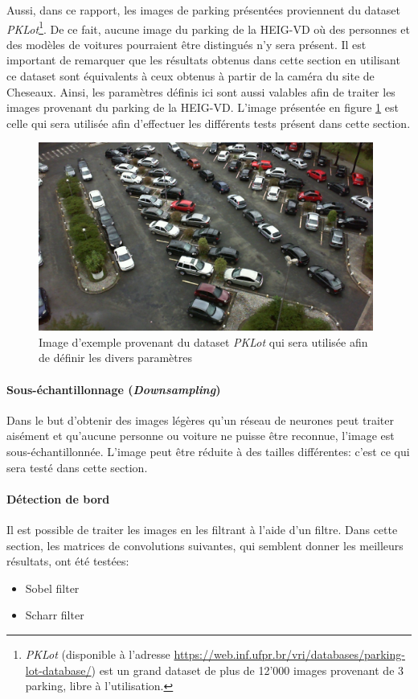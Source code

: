 Aussi, dans ce rapport, les images de parking présentées proviennent du dataset \textit{PKLot}\footnote{\textit{PKLot} (disponible à l'adresse \url{https://web.inf.ufpr.br/vri/databases/parking-lot-database/}) est un grand dataset de plus de 12'000 images provenant de 3 parking, libre à l'utilisation.\autocite{paper:pklot}}. De ce fait, aucune image du parking de la HEIG-VD où des personnes et des modèles de voitures pourraient être distingués n'y sera présent. Il est important de remarquer que les résultats obtenus dans cette section en utilisant ce dataset sont équivalents à ceux obtenus à partir de la caméra du site de Cheseaux. Ainsi, les paramètres définis ici sont aussi valables afin de traiter les images provenant du parking de la HEIG-VD. L'image présentée en figure \ref{fig:pklot-park} est celle qui sera utilisée afin d'effectuer les différents tests présent dans cette section.

\begin{figure}[ht]
    \includegraphics[width=110mm]{img/conception/pklot_park.jpg}
    \centering
    \caption{Image d'exemple provenant du dataset \textit{PKLot} qui sera utilisée afin de définir les divers paramètres}
    \label{fig:pklot-park}
\end{figure}


\paragraph{Sous-échantillonnage (\textit{Downsampling})}
Dans le but d'obtenir des images légères qu'un réseau de neurones peut traiter aisément et qu'aucune personne ou voiture ne puisse être reconnue, l'image est sous-échantillonnée. L'image peut être réduite à des tailles différentes: c'est ce qui sera testé dans cette section.

\paragraph{Détection de bord}
Il est possible de traiter les images en les filtrant à l'aide d'un filtre. Dans cette section, les matrices de convolutions suivantes, qui semblent donner les meilleurs résultats, ont été testées:
\begin{itemize}
    \item Sobel filter
    \item Scharr filter
\end{itemize} 

